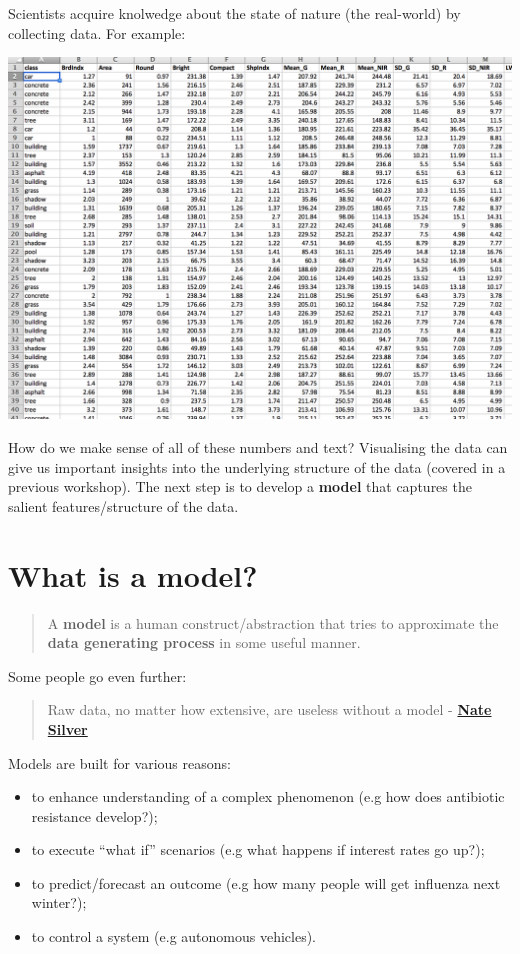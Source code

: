 \documentclass[]{book}
\providecommand{\tightlist}{%
  \setlength{\itemsep}{0pt}\setlength{\parskip}{0pt}}
\theoremstyle{definition}
\theoremstyle{definition}
\theoremstyle{definition}
\theoremstyle{remark}
\begin{document}
Scientists acquire knolwedge about the state of nature (the real-world)
by collecting data. For example:

\begin{center}\includegraphics[width=0.7\linewidth]{_img/01-data} \end{center}

How do we make sense of all of these numbers and text? Visualising the
data can give us important insights into the underlying structure of the
data (covered in a previous workshop). The next step is to develop a
\textbf{model} that captures the salient features/structure of the data.

\section{What is a model?}\label{what-is-a-model}

\begin{quote}
A \textbf{model} is a human construct/abstraction that tries to
approximate the \textbf{data generating process} in some useful manner.
\end{quote}

Some people go even further:

\begin{quote}
Raw data, no matter how extensive, are useless without a model -
\href{https://www.newyorker.com/books/page-turner/what-nate-silver-gets-wrong\%22}{\textbf{Nate
Silver}}
\end{quote}

Models are built for various reasons:

\begin{itemize}
\tightlist
\item
  to enhance understanding of a complex phenomenon (e.g how does
  antibiotic resistance develop?);
\item
  to execute ``what if'' scenarios (e.g what happens if interest rates
  go up?);
\item
  to predict/forecast an outcome (e.g how many people will get influenza
  next winter?);
\item
  to control a system (e.g autonomous vehicles).
\end{itemize}
\end{document}
